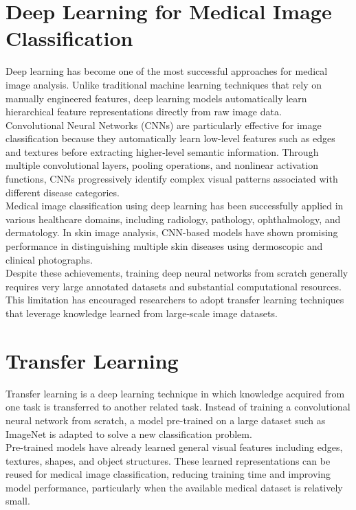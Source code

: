 \section{Deep Learning for Medical Image Classification}
Deep learning has become one of the most successful approaches for medical image analysis. Unlike traditional machine learning techniques that rely on manually engineered features, deep learning models automatically learn hierarchical feature representations directly from raw image data.\\
Convolutional Neural Networks (CNNs) are particularly effective for image classification because they automatically learn low-level features such as edges and textures before extracting higher-level semantic information. Through multiple convolutional layers, pooling operations, and nonlinear activation functions, CNNs progressively identify complex visual patterns associated with different disease categories.\\
Medical image classification using deep learning has been successfully applied in various healthcare domains, including radiology, pathology, ophthalmology, and dermatology. In skin image analysis, CNN-based models have shown promising performance in distinguishing multiple skin diseases using dermoscopic and clinical photographs.\\
Despite these achievements, training deep neural networks from scratch generally requires very large annotated datasets and substantial computational resources. This limitation has encouraged researchers to adopt transfer learning techniques that leverage knowledge learned from large-scale image datasets.

\section{Transfer Learning}
Transfer learning is a deep learning technique in which knowledge acquired from one task is transferred to another related task. Instead of training a convolutional neural network from scratch, a model pre-trained on a large dataset such as ImageNet is adapted to solve a new classification problem.\\
Pre-trained models have already learned general visual features including edges, textures, shapes, and object structures. These learned representations can be reused for medical image classification, reducing training time and improving model performance, particularly when the available medical dataset is relatively small.\\

